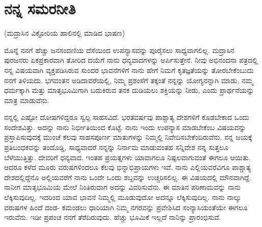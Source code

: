 
\chapter{ನನ್ನ ಸಮರನೀತಿ}

\begin{center}
(ಮದ್ರಾಸಿನ ವಿಕ್ಟೋರಿಯ ಹಾಲಿನಲ್ಲಿ ಮಾಡಿದ ಭಾಷಣ)
\end{center}

\vskip 2pt

ಮೊನ್ನೆ ನನಗೆ ಹೆಚ್ಚು ಜನಸಂದಣಿಯ ದೆಸೆಯಿಂದ ಉಪನ್ಯಾಸವನ್ನು ಪೂರೈಸಲು ಸಾಧ್ಯವಾಗಲಿಲ್ಲ. ಮದ್ರಾಸಿನ ಪುರಜನರು ಏಕಪ್ರಕಾರವಾಗಿ ತೋರಿದ ದಯೆಗೆ ನಾನು ಧನ್ಯವಾದಗಳನ್ನು ಅರ್ಪಿಸುತ್ತೇನೆ. ನೀವು ಅಭಿನಂದನಾ ಪತ್ರದಲ್ಲಿ ನನ್ನ ವಿಷಯವಾಗಿ ವ್ಯಕ್ತಪಡಿಸಿರುವ ಸುಂದರ ಭಾವನೆಗಳಿಗೆ ನಾನು ಹೇಗೆ ನಿಮಗೆ ಕೃತಜ್ಞತೆಯನ್ನು ತೋರಬೇಕೆಂಬುದು ನನಗೆ ತಿಳಿಯದು. ಭಗವಂತನ ಅಡಿದಾವರೆಯಲ್ಲಿ, ನಿಮ್ಮ ಪ್ರಶಂಸೆಗೆ ತಕ್ಕಂತೆ ನನ್ನನ್ನು ಯೋಗ್ಯನನ್ನಾಗಿ ಮಾಡು, ನಮ್ಮ ಧರ್ಮಕ್ಕಾಗಿ ಮತ್ತು ಮಾತೃಭೂಮಿಗಾಗಿ ಬದುಕಿರುವ ತನಕ ದುಡಿಯಲು ಶಕ್ತಿಯನ್ನು ನೀಡು, ಎಂದು ಪ್ರಾರ್ಥನೆಯನ್ನು ಮಾತ್ರ ಮಾಡುವೆನು.

\vskip 2pt

ನನ್ನಲ್ಲಿ ಎಷ್ಟೋ ದೋಷಗಳಿದ್ದರೂ ಸ್ವಲ್ಪ ಸಾಹಸವಿದೆ. ಭರತವರ್ಷವು ಪಾಶ್ಚಾತ್ಯ ದೇಶಗಳಿಗೆ ಕೊಡಬೇಕಾದ ಒಂದು ಸಂದೇಶವಿತ್ತು. ಅದನ್ನು ನಾನು ನಿರ್ಭೀತಿಯಿಂದ ಕೊಟ್ಟೆ. ನಾನು ಇಂದು ಉಪನ್ಯಾಸ ಮಾಡಬೇಕೆಂಬ ವಿಷಯವನ್ನು ಪ್ರಸ್ತಾಪಿಸುವುದಕ್ಕೆ ಮುಂಚೆ ಕೆಲವು ಸಾಹಸಪೂರ್ಣ ಮಾತುಗಳನ್ನು ನಿಮ್ಮಲ್ಲಿ ನಿವೇದಿಸಬೇಕೆಂದಿರುವೆನು. ನನ್ನ ಜಯಕ್ಕೆ ಪ್ರತಿಬಂಧಕವನ್ನು ತಂದೊಡ್ಡಿ, ಸಾಧ್ಯವಾದರೆ ನನ್ನನ್ನು ನಿರ್ನಾಮ ಮಾಡುವಂತಹ ಸನ್ನಿವೇಶ ನನ್ನ ಸುತ್ತಲೂ ಬೆಳೆಯುತ್ತಿತ್ತು. ದೇವರಿಗೆ ಧನ್ಯವಾದ. ಇಂತಹ ಪ್ರಯತ್ನಗಳು ಯಾವಾಗಲೂ ನಿಷ್ಫಲವಾಗುವಂತೆ ಈಗಲೂ ಆಯಿತು. ಆದರೂ ಕಳೆದ ಮೂರು ವರುಷಗಳಿಂದಲೂ ಕೆಲವು ಭಿನ್ನಾಭಿಪ್ರಾಯಗಳು ಇವೆ. ನಾನು ಎಲ್ಲಿಯವರೆವಿಗೂ ಪಾಶ್ಚಾತ್ಯ ದೇಶದಲ್ಲಿದ್ದೆನೊ ಅಲ್ಲಿಯವರೆಗೆ ನಾನು ಒಂದೇ ಒಂದು ಶಬ್ದವನ್ನು ಉಚ್ಚರಿಸಲಿಲ್ಲ. ಈ ವಿಷಯದಲ್ಲಿ ಮೌನವಾಗಿದ್ದೆ. ನಾನೀಗ ಮಾತೃಭೂಮಿಯ ಮೇಲೆ ನಿಂತಿರುವಾಗ ಅದನ್ನು ವಿವರಿಸುವೆನು. ಈ ಮಾತಿನ ಪರಿಣಾಮವನ್ನು ನಾನು ಲೆಕ್ಕಿಸುವುದಿಲ್ಲ. ಇದರಿಂದ ಯಾವ ಭಾವನೆ ನಿಮ್ಮಲ್ಲಿ ಮೂಡುವುದೋ ಅದನ್ನೂ ಲೆಕ್ಕಿಸುವುದಿಲ್ಲ. ನಾನು ನಾಲ್ಕು ವರುಷಗಳ ಹಿಂದೆ ದಂಡ- ಕಮಂಡಲು ಧಾರಿಯಾಗಿ ನಿಮ್ಮ ನಗರವನ್ನು ಪ್ರವೇಶಿಸಿದ ಸಂನ್ಯಾಸಿಯಂತೆಯೇ ಈಗಲೂ ಇರುವೆನು. ಇಡೀ ಪ್ರಪಂಚ ನನಗೆ ತೆರೆದಿರುವುದು. ಹೆಚ್ಚು ಭೂಮಿಕೆ ಇಲ್ಲದೆ ನಾನಿನ್ನು ಪ್ರಾರಂಭಿಸುವೆ.

